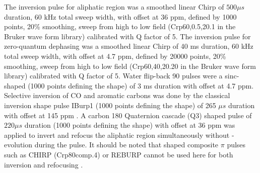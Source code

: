 \documentclass[twocolumn]{svjour3}           %
\begin{document}
The inversion pulse for \clab{} aliphatic region was a smoothed
linear Chirp of $500 \mu s$ duration, 60 kHz total sweep width, with 
offset at 36 ppm, defined by 1000 points, 20\% smoothing, sweep from 
high to low field (Crp60,0.5,20.1 in the Bruker wave form library)
\cite{kupce_optimized_1996,fu_broadband_1995}
calibrated with Q factor of 5. The inversion pulse for \hlab{} zero-quantum dephasing \cite{thrippleton_elimination_2003,harris_zero-quantum_2011} was a smoothed linear Chirp of 40 ms duration, 60 kHz total sweep width, with 
offset at 4.7 ppm, defined by 20000 points, 20\% smoothing, sweep from 
high to low field (Crp60,40,20.20 in the Bruker wave form library) calibrated with Q factor of 5. Water \hlab{} flip-back 90\degree{} pulses were a sinc-shaped \cite{cavanagh_protein_2007} (1000 points defining the shape) of 3 ms duration with offset at 4.7 ppm. Selective inversion of CO and aromatic carbons was done by the classical inversion shape pulse IBurp1 (1000 points defining the shape) of 265 $\mu s$ duration with offset at 145 ppm
\cite{geen_band-selective_1991,vincent_chapter_1997}.
 A carbon 180\degree{} Quaternion cascade (Q3) shaped pulse of 
 $220 \mu s$ duration (1000 points defining the shape) with offset at 
 36 ppm  \cite{vincent_chapter_1997,emsley_optimization_1992}
 was applied to invert and refocus the aliphatic region simultaneously
 without \oneJch{}-evolution \cite{lescop_guidelines_2010}
 during the pulse. It should be noted that shaped composite $\pi$ pulses
 such as CHIRP (Crp80comp.4) \cite{hwang_broadband_1997}
 or REBURP \cite{geen_band-selective_1991}
 cannot be used here for both inversion and refocusing \cite{xia_enhancing_2017}.
\end{document}
